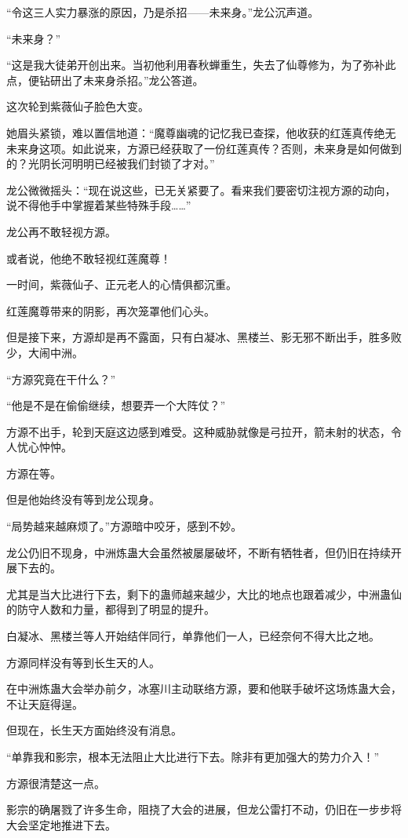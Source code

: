 \begin{this_body}
“令这三人实力暴涨的原因，乃是杀招——未来身。”龙公沉声道。

“未来身？”

“这是我大徒弟开创出来。当初他利用春秋蝉重生，失去了仙尊修为，为了弥补此点，便钻研出了未来身杀招。”龙公答道。

这次轮到紫薇仙子脸色大变。

她眉头紧锁，难以置信地道：“魔尊幽魂的记忆我已查探，他收获的红莲真传绝无未来身这项。如此说来，方源已经获取了一份红莲真传？否则，未来身是如何做到的？光阴长河明明已经被我们封锁了才对。”

龙公微微摇头：“现在说这些，已无关紧要了。看来我们要密切注视方源的动向，说不得他手中掌握着某些特殊手段……”

龙公再不敢轻视方源。

或者说，他绝不敢轻视红莲魔尊！

一时间，紫薇仙子、正元老人的心情俱都沉重。

红莲魔尊带来的阴影，再次笼罩他们心头。

但是接下来，方源却是再不露面，只有白凝冰、黑楼兰、影无邪不断出手，胜多败少，大闹中洲。

“方源究竟在干什么？”

“他是不是在偷偷继续，想要弄一个大阵仗？”

方源不出手，轮到天庭这边感到难受。这种威胁就像是弓拉开，箭未射的状态，令人忧心忡忡。

方源在等。

但是他始终没有等到龙公现身。

“局势越来越麻烦了。”方源暗中咬牙，感到不妙。

龙公仍旧不现身，中洲炼蛊大会虽然被屡屡破坏，不断有牺牲者，但仍旧在持续开展下去的。

尤其是当大比进行下去，剩下的蛊师越来越少，大比的地点也跟着减少，中洲蛊仙的防守人数和力量，都得到了明显的提升。

白凝冰、黑楼兰等人开始结伴同行，单靠他们一人，已经奈何不得大比之地。

方源同样没有等到长生天的人。

在中洲炼蛊大会举办前夕，冰塞川主动联络方源，要和他联手破坏这场炼蛊大会，不让天庭得逞。

但现在，长生天方面始终没有消息。

“单靠我和影宗，根本无法阻止大比进行下去。除非有更加强大的势力介入！”

方源很清楚这一点。

影宗的确屠戮了许多生命，阻挠了大会的进展，但龙公雷打不动，仍旧在一步步将大会坚定地推进下去。


\end{this_body}
